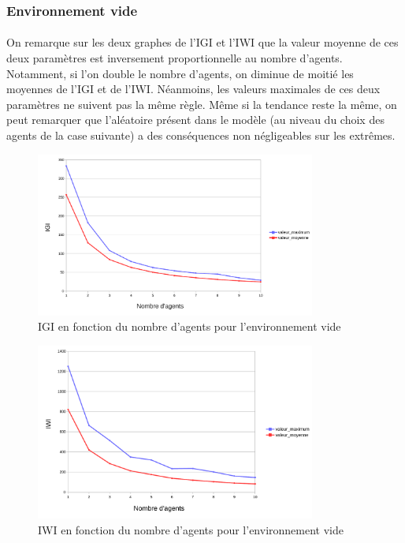 \documentclass{article}
\begin{document}
        \subsubsection{Environnement vide}
            \paragraph{} On remarque sur les deux graphes de l'IGI et l'IWI que la valeur moyenne de ces deux paramètres est inversement proportionnelle au nombre d'agents.
            Notamment, si l'on double le nombre d'agents, on diminue de moitié les moyennes de l'IGI et de l'IWI. Néanmoins, les valeurs maximales de ces deux paramètres ne suivent pas la même règle.
            Même si la tendance reste la même, on peut remarquer que l'aléatoire présent dans le modèle (au niveau du choix des agents de la case suivante) a des conséquences non négligeables sur les
            extrêmes.
            \begin{figure}[!h]
                \begin{center}
                    \includegraphics[width = 0.82\textwidth]{graphes pdf/variance tortues IGI.pdf}
                    \caption{IGI en fonction du nombre d'agents pour l'environnement vide}
                \end{center}
            \end{figure}
            \begin{figure}[!h]
                \begin{center}
                    \includegraphics[width = 0.82\textwidth]{graphes pdf/variance tortues IWI.pdf}
                    \caption{IWI en fonction du nombre d'agents pour l'environnement vide}
                \end{center}
            \end{figure}
            \newpage
\end{document}
